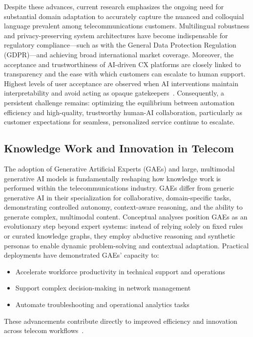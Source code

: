 \documentclass[sigconf]{acmart}
\begin{document}
Despite these advances, current research emphasizes the ongoing need for substantial domain adaptation to accurately capture the nuanced and colloquial language prevalent among telecommunications customers. Multilingual robustness and privacy-preserving system architectures have become indispensable for regulatory compliance—such as with the General Data Protection Regulation (GDPR)—and achieving broad international market coverage. Moreover, the acceptance and trustworthiness of AI-driven CX platforms are closely linked to transparency and the ease with which customers can escalate to human support. Highest levels of user acceptance are observed when AI interventions maintain interpretability and avoid acting as opaque gatekeepers~\cite{ref18}. Consequently, a persistent challenge remains: optimizing the equilibrium between automation efficiency and high-quality, trustworthy human-AI collaboration, particularly as customer expectations for seamless, personalized service continue to escalate.

\subsection{Knowledge Work and Innovation in Telecom}

The adoption of Generative Artificial Experts (GAEs) and large, multimodal generative AI models is fundamentally reshaping how knowledge work is performed within the telecommunications industry. GAEs differ from generic generative AI in their specialization for collaborative, domain-specific tasks, demonstrating controlled autonomy, context-aware reasoning, and the ability to generate complex, multimodal content. Conceptual analyses position GAEs as an evolutionary step beyond expert systems: instead of relying solely on fixed rules or curated knowledge graphs, they employ abductive reasoning and synthetic personas to enable dynamic problem-solving and contextual adaptation. Practical deployments have demonstrated GAEs' capacity to:

\begin{itemize}
    \item Accelerate workforce productivity in technical support and operations
    \item Support complex decision-making in network management
    \item Automate troubleshooting and operational analytics tasks
\end{itemize}

\noindent These advancements contribute directly to improved efficiency and innovation across telecom workflows~\cite{ref2,ref15,ref8,ref18}.
\end{document}
